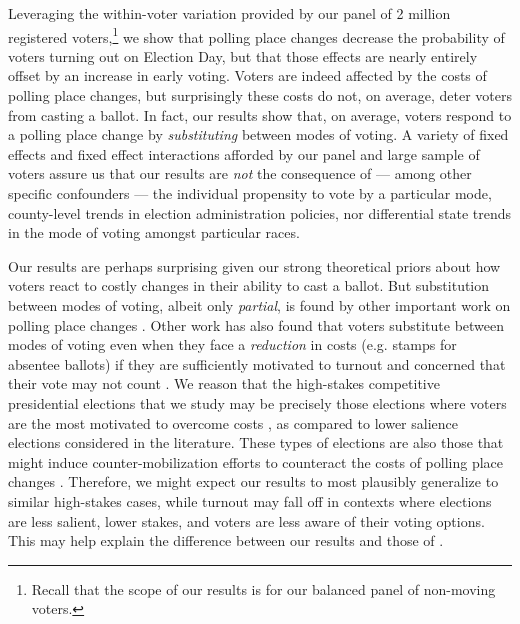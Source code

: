 \documentclass{cup_PSRM}
\begin{document}
Leveraging the within-voter variation provided by our panel of 2 million registered voters,\footnote{Recall that the scope of our results is for our balanced panel of non-moving voters.} we show that polling place changes decrease the probability of voters turning out on Election Day, but that those effects are nearly entirely offset by an increase in early voting.  Voters are indeed affected by the costs of polling place changes, but surprisingly these costs do not, on average, deter voters from casting a ballot.  In fact, our results show that, on average, voters respond to a polling place change by \emph{substituting} between modes of voting.  A variety of fixed effects and fixed effect interactions afforded by our panel and large sample of voters assure us that our results are \emph{not} the consequence of --- among other specific confounders --- the individual propensity to vote by a particular mode, county-level trends in election administration policies, nor differential state trends in the mode of voting amongst particular races.

Our results are perhaps surprising given our strong theoretical priors about how voters react to costly changes in their ability to cast a ballot.  But substitution between modes of voting, albeit only \emph{partial}, is found by other important work on polling place changes \cite{brady2011turning}. Other work has also found that voters substitute between modes of voting even when they face a \emph{reduction} in costs (e.g. stamps for absentee ballots) if they are sufficiently motivated to turnout and concerned that their vote may not count \citep{meredith2011convenience}.  We reason that the high-stakes competitive presidential elections that we study may be precisely those elections where voters are the most motivated to overcome costs \citep{kousser2007does}, as compared to lower salience elections considered in the literature.  These types of elections are also those that might induce counter-mobilization efforts to counteract the costs of polling place changes \cite{fraga2010voting}.  Therefore, we might expect our results to most plausibly generalize to similar high-stakes cases, while turnout may fall off in contexts where elections are less salient, lower stakes, and voters are less aware of their voting options.  This may help explain the difference between our results and those of \cite{brady2011turning}.
\end{document}
